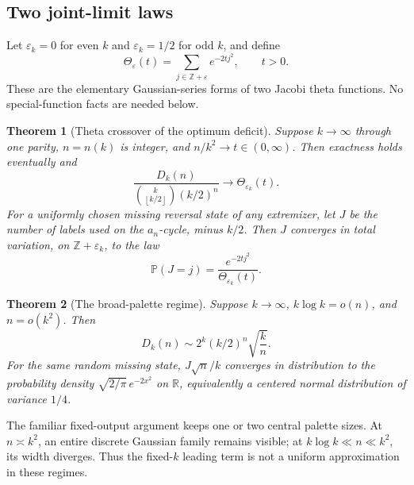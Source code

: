 \documentclass[11pt,a4paper]{article}
\numberwithin{equation}{section}
\newtheorem{theorem}{Theorem}[section]
\theoremstyle{definition}
\theoremstyle{remark}
\newcommand{\Z}{\mathbb Z}
\newcommand{\nlfloor}[1]{\left\lfloor #1\right\rfloor}
\begin{document}
\subsection{Two joint-limit laws}
Let $\varepsilon_k=0$ for even $k$ and $\varepsilon_k=1/2$ for odd $k$, and define
\begin{equation}\label{nl:eq:theta}
 \Theta_\varepsilon(t)=\sum_{j\in\Z+\varepsilon}e^{-2tj^2},\qquad t>0.
\end{equation}
These are the elementary Gaussian-series forms of two Jacobi theta
functions. No special-function facts are needed below.

\begin{theorem}[Theta crossover of the optimum deficit]\label{nl:thm:thetaintro}
Suppose $k\to\infty$ through one parity, $n=n(k)$ is integer, and
$n/k^2\to t\in(0,\infty)$. Then exactness holds eventually and
\begin{equation}\label{nl:eq:thetalimit}
 \frac{D_k(n)}{\binom{k}{\nlfloor{k/2}}(k/2)^n}
 \longrightarrow\Theta_{\varepsilon_k}(t).
\end{equation}
For a uniformly chosen missing reversal state of any extremizer, let
$J$ be the number of labels used on the $a_n$-cycle, minus $k/2$.
Then $J$ converges in total variation, on $\Z+\varepsilon_k$, to the law
\[
 \mathbb P(J=j)=\frac{e^{-2tj^2}}{\Theta_{\varepsilon_k}(t)}.
\]
\end{theorem}

\begin{theorem}[The broad-palette regime]\label{nl:thm:gaussianintro}
Suppose $k\to\infty$, $k\log k=o(n)$, and $n=o(k^2)$. Then
\begin{equation}\label{nl:eq:gaussianintro}
 D_k(n)\sim 2^k(k/2)^n\sqrt{\frac{k}{n}}.
\end{equation}
For the same random missing state, $J\sqrt n/k$ converges in distribution
to the probability density $\sqrt{2/\pi}\,e^{-2x^2}$ on $\mathbb R$, equivalently
a centered normal distribution of variance $1/4$.
\end{theorem}

The familiar fixed-output argument keeps one or two central palette sizes.
At $n\asymp k^2$, an entire discrete Gaussian family remains visible;
at $k\log k\ll n\ll k^2$, its width diverges. Thus the fixed-$k$ leading
term is not a uniform approximation in these regimes.
\end{document}
